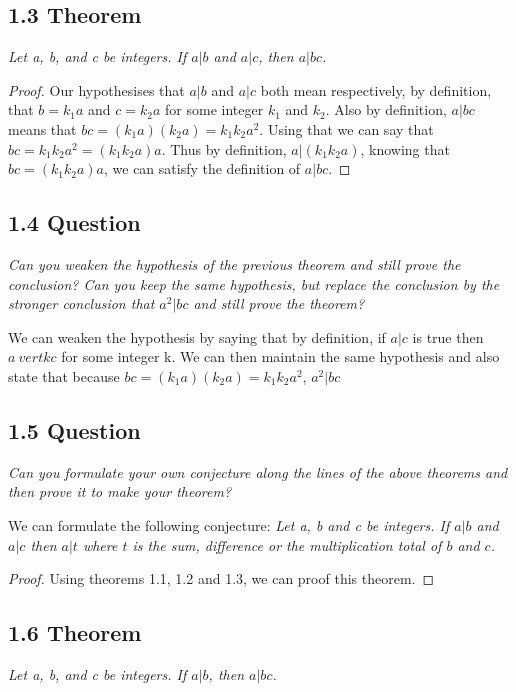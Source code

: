 \documentclass{article}
\begin{document}
\subsection*{1.3 Theorem} 
\quad \textit{Let a, b, and c be integers. If $a \vert b$ and $a \vert c$, then $a \vert bc$.}

\begin{proof}
Our hypothesises that $a \vert b$ and $a \vert c$ both mean respectively, by definition, that $b = k_1a$ and $c = k_2a$ for some integer $k_1$ and $k_2$. Also by definition, $a \vert bc$ means that $bc = (k_1a)(k_2a) = k_1k_2a^2$. Using that we can say that $bc = k_1k_2a^2 = (k_1k_2a)a$. Thus by definition, $a \vert (k_1k_2a)$, knowing that $bc= (k_1k_2a)a$, we can satisfy the definition of $a \vert bc$.
\end{proof}

\subsection*{1.4 Question} 
\quad \textit{Can you weaken the hypothesis of the previous theorem and still prove the conclusion? Can you keep the same hypothesis, but replace the conclusion by the stronger conclusion that $a^2 \vert bc$ and still prove the theorem?}

We can weaken the hypothesis by saying that by definition, if $a \vert c$ is true then $a \ vert kc$ for some integer k. We can then maintain the same hypothesis and also state that because $bc = (k_1a)(k_2a) = k_1k_2a^2$, $a^2 \vert bc$

\subsection*{1.5 Question} 
\quad \textit{Can you formulate your own conjecture along the lines of the above theorems and then prove it to make your theorem?}

We can formulate the following conjecture: \textit{Let a, b and c be integers. If $a \vert b$ and $a \vert c$ then $a \vert t$ where $t$ is the sum, difference or the multiplication total of $b$ and $c$.}
\begin{proof}
Using theorems 1.1, 1.2 and 1.3, we can proof this theorem.
\end{proof}

\subsection*{1.6 Theorem} 
\quad \textit{Let a, b, and c be integers. If $a \vert b$, then $a \vert bc$.}
\end{document}
